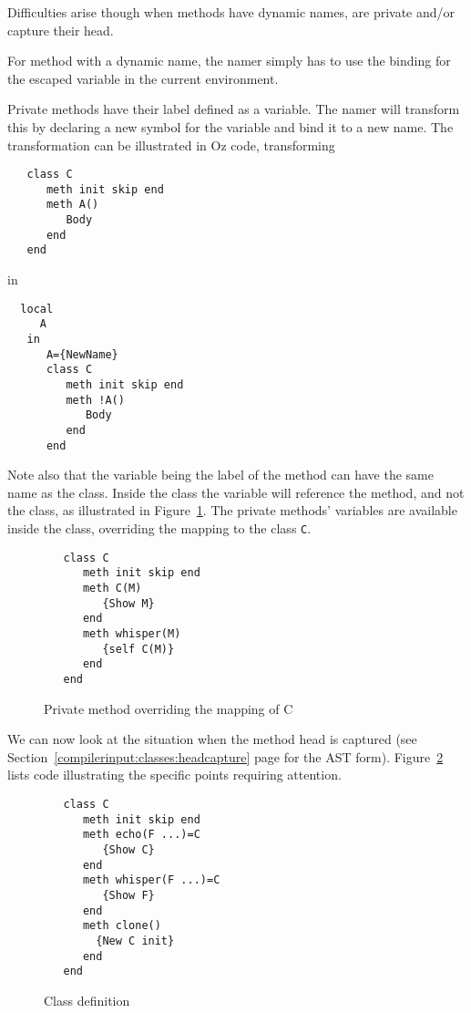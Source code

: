 \documentclass[a4paper]{memoir}
\begin{document}
Difficulties arise though when methods have dynamic names, are private and/or
capture their head.

For method with a dynamic name, the namer simply has to use the binding for the
escaped variable in the current environment.

Private methods have their label defined as a variable. The namer will transform this by 
declaring a new symbol for the variable and bind it to a new name.
The transformation can be illustrated in Oz code, transforming

\begin{lstlisting}
   class C
      meth init skip end
      meth A()
         Body
      end
   end
\end{lstlisting}

in

\begin{lstlisting}
  local
     A
   in
      A={NewName}
      class C
         meth init skip end
         meth !A()
            Body
         end
      end
\end{lstlisting}

Note also that the variable being the label of the method can have the same name
as the class. Inside the class the variable will reference the method, and not the class, 
as illustrated in Figure~\ref{fig:class_method_binding}. The private methods'
variables are available inside the class, overriding the mapping to the class
\lstinline!C!.
\begin{figure}[h]
\begin{lstlisting}
   class C
      meth init skip end
      meth C(M)
         {Show M}
      end
      meth whisper(M)
         {self C(M)}
      end
   end
\end{lstlisting}
\caption{Private method overriding the mapping of C}
\label{fig:class_method_binding}
\end{figure}



We can now look at the situation when the method head is captured (see
Section~\ref{compilerinput:classes:headcapture} page
\pageref{compilerinput:classes:headcapture} for the AST form).
Figure~\ref{fig:attentionpoints} lists code illustrating the specific points requiring attention.
\begin{figure}[h]
\begin{lstlisting}
   class C
      meth init skip end
      meth echo(F ...)=C
         {Show C}
      end
      meth whisper(F ...)=C
         {Show F}
      end
      meth clone()
        {New C init}
      end
   end
\end{lstlisting}
\caption{Class definition}
\label{fig:attentionpoints}
\end{figure}
\end{document}
